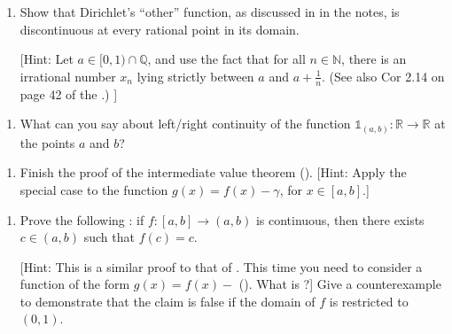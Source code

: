 \documentclass[letterpaper,10pt,english]{jupyterBook}
\begin{document}
\label{\detokenize{Problems:id22}}\begin{enumerate}
%
\setcounter{enumi}{21}
\item {} 
\sphinxAtStartPar
{} Show that Dirichlet’s “other” function, as discussed in  in the notes, is discontinuous at every rational point in its domain.

{[}Hint: Let \(a\in[0,1)\cap\mathbb{Q}\), and use the fact that for all \(n\in\mathbb{N}\), there is an irrational number \(x_n\) lying strictly between \(a\) and \(a+\frac{1}{n}\). (See also Cor 2.14 on page 42 of the .) {]}

\end{enumerate}
\label{\detokenize{Problems:id23}}\begin{enumerate}
%
\setcounter{enumi}{22}
\item {} 
\sphinxAtStartPar
What can you say about left/right continuity of the function  \(\mathbb{1}_{(a, b)}:\mathbb{R}\to\mathbb{R}\) at the points \(a\) and \(b\)?

\end{enumerate}
\label{\detokenize{Problems:id24}}\begin{enumerate}
%
\setcounter{enumi}{23}
\item {} 
\sphinxAtStartPar
Finish the proof of the intermediate value theorem (). {[}Hint: Apply the special case  to the function \(g(x) = f(x) - \gamma\), for \(x \in [a, b]\).{]}

\end{enumerate}
\label{\detokenize{Problems:id25}}\begin{enumerate}
%
\setcounter{enumi}{24}
\item {} 
\sphinxAtStartPar
{} Prove the following : if \(f:[a,b] \rightarrow (a,b)\) is continuous, then there exists \(c \in (a,b)\) such that \(f(c) = c\).

{[}Hint: This is a similar proof to that of {\hyperref[\detokenize{Problems:id24}]{}}. This time you need to consider a function of the form \(g(x) = f(x) - \) (). What is ?{]} Give a counter\sphinxhyphen{}example to demonstrate that the claim is false if the domain of \(f\) is restricted to \((0, 1)\).

\end{enumerate}
\end{document}
